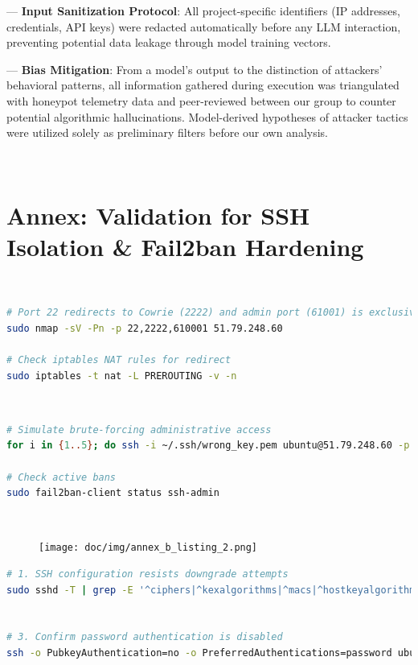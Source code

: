 --- \textbf{Input Sanitization Protocol}: All project-specific identifiers (IP addresses, credentials, API
keys) were redacted automatically before any LLM interaction, preventing potential data leakage through model training vectors.


--- \textbf{Bias Mitigation}: From a model's output to the distinction of attackers' behavioral patterns, all information gathered during execution was triangulated with honeypot telemetry data and peer-reviewed between our group to counter potential algorithmic hallucinations. Model-derived hypotheses of attacker tactics were utilized solely as preliminary filters before our own analysis.

\



\newpage

\section{Annex: Validation for SSH Isolation \& Fail2ban Hardening} 
\label{annex:network}
\
\
\begin{lstlisting}[language=bash, label={annexes:network}, caption={Network Isolation Verification}]  
# Port 22 redirects to Cowrie (2222) and admin port (61001) is exclusive  
sudo nmap -sV -Pn -p 22,2222,610001 51.79.248.60

# Check iptables NAT rules for redirect
sudo iptables -t nat -L PREROUTING -v -n  
\end{lstlisting}  
\


\begin{lstlisting}[language=bash, label={annexes:fail2ban}, caption={Fail2ban Efficacy Testing}]  
# Simulate brute-forcing administrative access 
for i in {1..5}; do ssh -i ~/.ssh/wrong_key.pem ubuntu@51.79.248.60 -p 61001; done  

# Check active bans  
sudo fail2ban-client status ssh-admin  
\end{lstlisting}  
\

\begin{figure}[h!]
\centering
    \texttt{[image: doc/img/annex\_b\_listing\_2.png]}
\end{figure}

\begin{lstlisting}[language=bash, label={annexes:ssh-hardening}, caption={SSH Service Hardening Validation}]  
# 1. SSH configuration resists downgrade attempts
sudo sshd -T | grep -E '^ciphers|^kexalgorithms|^macs|^hostkeyalgorithms'  


# 3. Confirm password authentication is disabled 
ssh -o PubkeyAuthentication=no -o PreferredAuthentications=password ubuntu@51.79.248.60 -p 61001  
\end{lstlisting}

